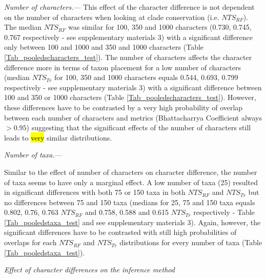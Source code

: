 \documentclass[12pt,letterpaper]{article}
\renewcommand{\subsection}[1]{%
\bigskip
\begin{center}
\begin{large}
\normalfont\itshape #1
\end{large}
\end{center}}
\renewcommand{\subsubsection}[1]{%
\vspace{2ex}
\noindent
\textit{#1.}---}
\begin{document}


\subsubsection{Number of characters}
This effect of the character difference is not dependent on the number of characters when looking at clade conservation (i.e. $NTS_{RF}$).
The median $NTS_{RF}$ was similar for 100, 350 and 1000 characters (0.730, 0.745, 0.767 respectively - see supplementary materials 3) with a significant difference only between 100 and 1000 and 350 and 1000 characters (Table \ref{Tab_pooledscharacters_test}).
The number of characters affects the character difference more in terms of taxon placement for a low number of characters (median $NTS_{Tr}$ for 100, 350 and 1000 characters equals 0.544, 0.693, 0.799 respectively - see supplementary materials 3) with a significant difference between 100 and 350 or 1000 characters (Table \ref{Tab_pooledscharacters_test}).
However, these differences have to be contrasted by a very high probability of overlap between each number of characters and metrics (Bhattacharrya Coefficient always $>0.95$) suggesting that the significant effects of the number of characters still leads to \hl{very} similar distributions.



\subsubsection{Number of taxa}

Similar to the effect of number of characters on character difference, the number of taxa seems to have only a marginal effect.
A low number of taxa (25) resulted in significant differences with both 75 or 150 taxa in both $NTS_{RF}$ and $NTS_{Tr}$ but no differences between 75 and 150 taxa (medians for 25, 75 and 150 taxa equals 0.802, 0.76, 0.763 $NTS_{RF}$ and 0.758, 0.588 and 0.615 $NTS_{Tr}$ respectively - Table \ref{Tab_pooledstaxa_test} and see supplementary materials 3).
Again, however, the significant differences have to be contrasted with still high probabilities of overlaps for each $NTS_{RF}$ and $NTS_{Tr}$ distributions for every number of taxa (Table \ref{Tab_pooledstaxa_test}).




\subsection{Effect of character differences on the inference method}
\end{document}
